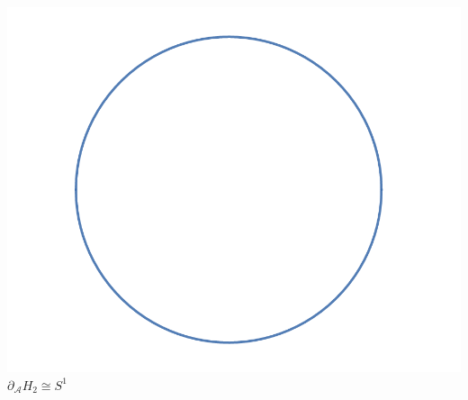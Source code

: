 \documentclass[12pt]{article}
\newcommand{\cA}{{\mathcal A}}
\theoremstyle{definition}
\begin{document}
\begin{enumerate}
\begin{center}
                  \includegraphics[scale = 0.5]{D H_0.png}\\
                  $\partial_\cA H_2 \cong S^1$
            
            \end{center}
\end{enumerate}
\end{document}
